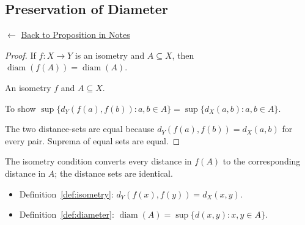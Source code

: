 
\subsection*{Preservation of Diameter}
\label{prf:isometry-preserves-diameter}

\begin{remark*}[Return]
$\leftarrow$ \hyperref[prop:isometry-preserves-diameter]{Back to Proposition in Notes}
\end{remark*}

\begin{proof}
\Claim If $f : X \to Y$ is an isometry and $A \subseteq X$, then
$\operatorname{diam}(f(A)) = \operatorname{diam}(A)$.

\Given An isometry $f$ and $A \subseteq X$.

\Goal To show $\sup\{d_Y(f(a),f(b)) : a,b \in A\} = \sup\{d_X(a,b) : a,b \in A\}$.

\Strategy The two distance-sets are equal because $d_Y(f(a),f(b)) = d_X(a,b)$
for every pair. Suprema of equal sets are equal.


\end{proof}

\begin{remark*}
The isometry condition converts every distance in $f(A)$ to the
corresponding distance in $A$; the distance sets are identical.
\end{remark*}

\begin{remark*}[Dependencies]
\begin{itemize}
  \item Definition~\ref{def:isometry}: $d_Y(f(x),f(y)) = d_X(x,y)$.
  \item Definition~\ref{def:diameter}: $\operatorname{diam}(A) = \sup\{d(x,y) : x,y \in A\}$.
\end{itemize}
\end{remark*}
